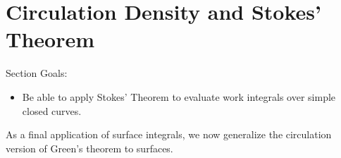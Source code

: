 


\newpage
\uday
\normalsize

\section{Circulation Density and Stokes' Theorem}
Section Goals:
\begin{itemize}
\item Be able to apply Stokes' Theorem to evaluate work integrals over simple closed curves.
\end{itemize}

As a final application of surface integrals, we now generalize the circulation version of Green's theorem to surfaces.   

